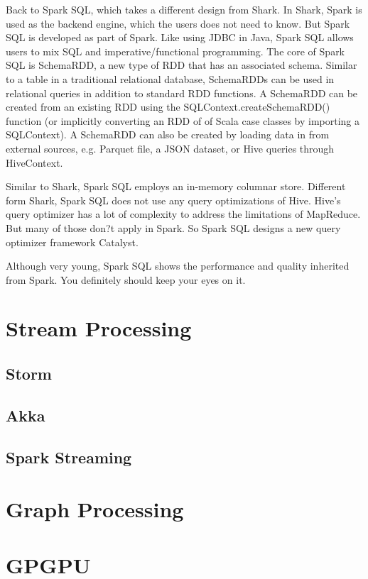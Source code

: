 \documentclass[11pt]{book}
\begin{document}
Back to Spark SQL, which takes a different design from Shark. In Shark, Spark is used as the backend engine, which the users does not need to know. But Spark SQL is developed as part of Spark. Like using JDBC in Java, Spark SQL allows users to mix SQL and imperative/functional programming. The core of Spark SQL is SchemaRDD, a new type of RDD that has an associated schema. Similar to a table in a traditional relational database, SchemaRDDs can be used in relational queries in addition to standard RDD functions. A SchemaRDD can be created from an existing RDD using the SQLContext.createSchemaRDD() function (or implicitly converting an RDD of of Scala case classes by importing a SQLContext). A SchemaRDD can also be created by loading data in from external sources, e.g. Parquet file, a JSON dataset, or Hive queries through HiveContext.

Similar to Shark, Spark SQL employs an in-memory columnar store. Different form Shark, Spark SQL does not use any query optimizations of Hive. Hive's query optimizer has a lot of complexity to address the limitations of MapReduce. But many of those don?t apply in Spark. So Spark SQL designs a new query optimizer framework Catalyst.

Although very young, Spark SQL shows the performance and quality inherited from Spark. You definitely should keep your eyes on it.

\chapter[Stream Processing]
{Stream Processing}

\section{Storm}

\section{Akka}

\section{Spark Streaming}

\chapter[Graph Processing]
{Graph Processing}

\chapter[GPGPU]
{GPGPU}
\end{document}

